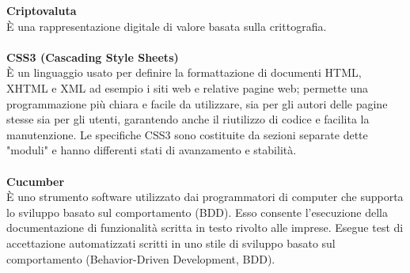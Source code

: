 \textbf{Criptovaluta}\\
È una rappresentazione digitale di valore basata sulla crittografia. \\ \\
\textbf{CSS3 (Cascading Style Sheets)}\\
È un linguaggio usato per definire la formattazione di documenti HTML, XHTML e XML ad esempio i siti web e relative pagine web; permette una programmazione più chiara e facile da utilizzare, sia per gli autori delle pagine stesse sia per gli utenti, garantendo anche il riutilizzo di codice e facilita la manutenzione. Le specifiche CSS3 sono costituite da sezioni separate dette "moduli" e hanno differenti stati di avanzamento e stabilità. \\ \\
\textbf{Cucumber}\\
È uno strumento software utilizzato dai programmatori di computer che supporta lo sviluppo basato sul comportamento (BDD). Esso consente l'esecuzione della documentazione di funzionalità scritta in testo rivolto alle imprese. Esegue test di accettazione automatizzati scritti in uno stile di sviluppo basato sul comportamento (Behavior-Driven Development, BDD). \\ \\
\clearpage